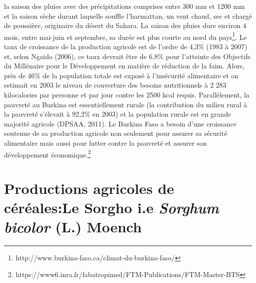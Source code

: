\documentclass[a4paper,11pt]{article}
\begin{document}
la saison des pluies avec des précipitations comprises entre 300 mm et
1200 mm et la saison sèche durant laquelle souffle l’harmattan, un
vent chaud, sec et chargé de poussière, originaire du désert du
Sahara. La saison des pluies dure environ 4 mois, entre mai-juin et
septembre, sa durée est plus courte au nord du
pays\footnote{http://www.burkina-faso.ca/climat-du-burkina-faso/}. Le
taux de croissance de la production agricole est de l’ordre de 4,3\%
(1983 à 2007) et, selon Ngaido (2006), ce taux devrait être de 6,8\%
pour l’atteinte des Objectifs du Millénaire pour le Développement en
matière de réduction de la faim. Alors, près de 46\% de la population
totale est exposé à l’insécurité alimentaire et on estimait en 2003 le
niveau de couverture des besoins nutritionnels à 2 283 kilocalories
par personne et par jour contre les 2500 kcal requis. Parallèlement,
la pauvreté au Burkina est essentiellement rurale
(la contribution du milieu rural à la
pauvreté s’élevait à 92,2\% en 2003) et la population rurale est en
grande majorité agricole (DPSAA, 2011).  Le Burkina Faso a besoin
d’une croissance soutenue de sa production agricole non seulement pour
assurer sa sécurité alimentaire mais aussi pour lutter contre la
pauvreté et assurer son développement économique.\footnote{https://www6.inra.fr/fabatropimed/FTM-Publications/FTM-Master-BTS} %

\section{Productions agricoles de céréales:Le Sorgho i.e \emph{Sorghum bicolor} (L.) Moench}


\end{document}

